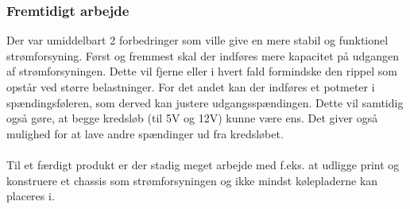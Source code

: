 \subsubsection{Fremtidigt arbejde}
Der var umiddelbart 2 forbedringer som ville give en mere stabil og funktionel strømforsyning. Først og fremmest skal der indføres mere kapacitet på udgangen af strømforsyningen. Dette vil fjerne eller i hvert fald formindske den rippel som opstår ved større belastninger. For det andet kan der indføres et potmeter i spændingsføleren, som derved kan justere udgangsspændingen. Dette vil samtidig også gøre, at begge kredsløb (til 5V og 12V) kunne være ens. Det giver også mulighed for at lave andre spændinger ud fra kredsløbet.
\\\\
Til et færdigt produkt er der stadig meget arbejde med f.eks. at udligge print og konstruere et chassis som strømforsyningen og ikke mindst kølepladerne kan placeres i.